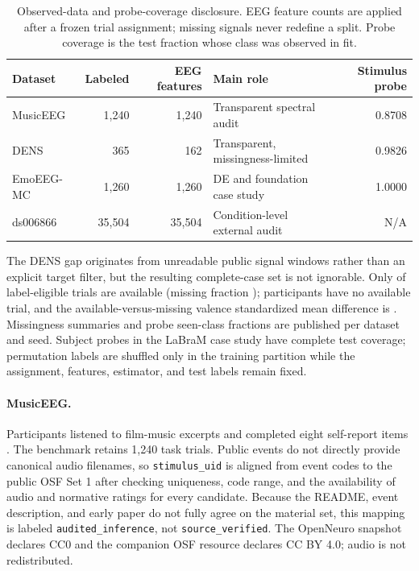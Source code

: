 \begin{table}[t]
  \caption{Observed-data and probe-coverage disclosure. EEG feature counts are
  applied after a frozen trial assignment; missing signals never redefine a
  split. Probe coverage is the test fraction whose class was observed in fit.}
  \label{tab:coverage}
  \centering
  \small
  \setlength{\tabcolsep}{4pt}
  \begin{tabularx}{\linewidth}{@{}lrrXr@{}}
    \toprule
    Dataset & Labeled & EEG features & Main role & Stimulus probe \\
    \midrule
    MusicEEG & 1,240 & 1,240 & Transparent spectral audit & 0.8708 \\
    DENS & 365 & 162 & Transparent, missingness-limited & 0.9826 \\
    EmoEEG-MC & 1,260 & 1,260 & DE and foundation case study & 1.0000 \\
    ds006866 & 35,504 & 35,504 & Condition-level external audit & N/A \\
    \bottomrule
  \end{tabularx}
\end{table}

The DENS gap originates from unreadable public signal windows rather than an
explicit target filter, but the resulting complete-case set is not ignorable.
Only  of  label-eligible trials are available
(missing fraction );  participants have no
available trial, and the available-versus-missing valence standardized mean
difference is . Missingness summaries and probe seen-class
fractions are published per dataset and seed. Subject probes in the LaBraM case study have complete test
coverage; permutation labels are shuffled only in the training partition while
the assignment, features, estimator, and test labels remain fixed.

\paragraph{MusicEEG.}
Participants listened to film-music excerpts and completed eight self-report
items \citep{daly2020musiceeg}. The benchmark retains 1,240 task trials. Public
events do not directly provide canonical audio filenames, so
\texttt{stimulus\_uid} is aligned from event codes to the public OSF Set 1 after
checking uniqueness, code range, and the availability of audio and normative
ratings for every candidate. Because the README, event description, and early
paper do not fully agree on the material set, this mapping is labeled
\texttt{audited\_inference}, not \texttt{source\_verified}. The OpenNeuro
snapshot declares CC0 and the companion OSF resource declares CC BY 4.0; audio
is not redistributed. %

